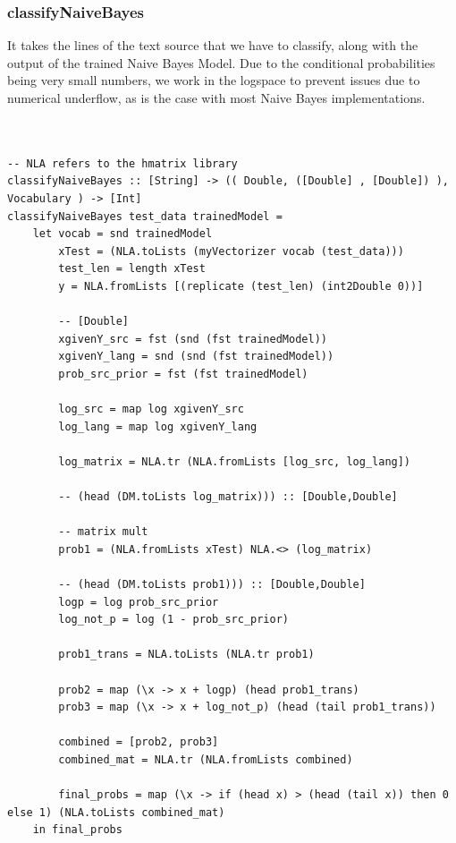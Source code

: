 \documentclass[12pt]{scrreprt}
\begin{document}
\subsubsection{classifyNaiveBayes}

It takes the lines of the text source that we have to classify, along with the output of the trained Naive Bayes Model. Due to the conditional probabilities being very small numbers, we work in the logspace to prevent issues due to numerical underflow, as is the case with most Naive Bayes implementations.\\ 
\begin{verbatim}
   
       
-- NLA refers to the hmatrix library
classifyNaiveBayes :: [String] -> (( Double, ([Double] , [Double]) ), Vocabulary ) -> [Int]
classifyNaiveBayes test_data trainedModel =
    let vocab = snd trainedModel
        xTest = (NLA.toLists (myVectorizer vocab (test_data)))
        test_len = length xTest
        y = NLA.fromLists [(replicate (test_len) (int2Double 0))]

        -- [Double]
        xgivenY_src = fst (snd (fst trainedModel))
        xgivenY_lang = snd (snd (fst trainedModel))
        prob_src_prior = fst (fst trainedModel)

        log_src = map log xgivenY_src
        log_lang = map log xgivenY_lang

        log_matrix = NLA.tr (NLA.fromLists [log_src, log_lang])

        -- (head (DM.toLists log_matrix))) :: [Double,Double]

        -- matrix mult
        prob1 = (NLA.fromLists xTest) NLA.<> (log_matrix)

        -- (head (DM.toLists prob1))) :: [Double,Double]
        logp = log prob_src_prior
        log_not_p = log (1 - prob_src_prior)

        prob1_trans = NLA.toLists (NLA.tr prob1)

        prob2 = map (\x -> x + logp) (head prob1_trans)
        prob3 = map (\x -> x + log_not_p) (head (tail prob1_trans))

        combined = [prob2, prob3]
        combined_mat = NLA.tr (NLA.fromLists combined)
        
        final_probs = map (\x -> if (head x) > (head (tail x)) then 0 else 1) (NLA.toLists combined_mat)
    in final_probs       
\end{verbatim}
\end{document}
